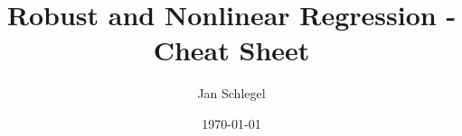 \documentclass[%
    ,a4paper
    ,fontsize=12pt %
    ,landscape
    ,pagesize
    ,headinclude
    ]{scrartcl}
\title{Robust and Nonlinear Regression - Cheat Sheet}
\author{Jan Schlegel}
\date{\today}
\begin{document}
\begin{multicols*}{3}


\maketitle

%



\end{multicols*}
\end{document}
